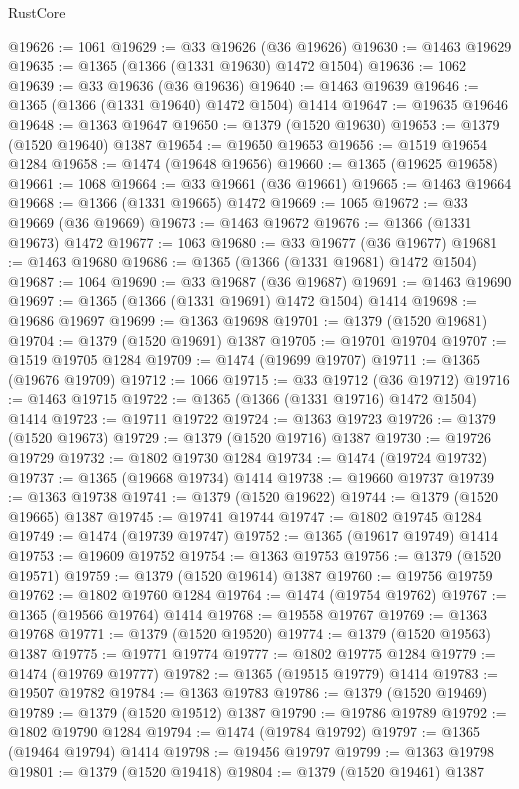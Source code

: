 \begin{lexlean}{RustCore}
\begin{coremodule}
@19626 := 1061
@19629 := @33 @19626 (@36 @19626)
@19630 := @1463 @19629
@19635 := @1365 (@1366 (@1331 @19630) @1472 @1504)
@19636 := 1062
@19639 := @33 @19636 (@36 @19636)
@19640 := @1463 @19639
@19646 := @1365 (@1366 (@1331 @19640) @1472 @1504) @1414
@19647 := @19635 @19646
@19648 := @1363 @19647
@19650 := @1379 (@1520 @19630)
@19653 := @1379 (@1520 @19640) @1387
@19654 := @19650 @19653
@19656 := @1519 @19654 @1284
@19658 := @1474 (@19648 @19656)
@19660 := @1365 (@19625 @19658)
@19661 := 1068
@19664 := @33 @19661 (@36 @19661)
@19665 := @1463 @19664
@19668 := @1366 (@1331 @19665) @1472
@19669 := 1065
@19672 := @33 @19669 (@36 @19669)
@19673 := @1463 @19672
@19676 := @1366 (@1331 @19673) @1472
@19677 := 1063
@19680 := @33 @19677 (@36 @19677)
@19681 := @1463 @19680
@19686 := @1365 (@1366 (@1331 @19681) @1472 @1504)
@19687 := 1064
@19690 := @33 @19687 (@36 @19687)
@19691 := @1463 @19690
@19697 := @1365 (@1366 (@1331 @19691) @1472 @1504) @1414
@19698 := @19686 @19697
@19699 := @1363 @19698
@19701 := @1379 (@1520 @19681)
@19704 := @1379 (@1520 @19691) @1387
@19705 := @19701 @19704
@19707 := @1519 @19705 @1284
@19709 := @1474 (@19699 @19707)
@19711 := @1365 (@19676 @19709)
@19712 := 1066
@19715 := @33 @19712 (@36 @19712)
@19716 := @1463 @19715
@19722 := @1365 (@1366 (@1331 @19716) @1472 @1504) @1414
@19723 := @19711 @19722
@19724 := @1363 @19723
@19726 := @1379 (@1520 @19673)
@19729 := @1379 (@1520 @19716) @1387
@19730 := @19726 @19729
@19732 := @1802 @19730 @1284
@19734 := @1474 (@19724 @19732)
@19737 := @1365 (@19668 @19734) @1414
@19738 := @19660 @19737
@19739 := @1363 @19738
@19741 := @1379 (@1520 @19622)
@19744 := @1379 (@1520 @19665) @1387
@19745 := @19741 @19744
@19747 := @1802 @19745 @1284
@19749 := @1474 (@19739 @19747)
@19752 := @1365 (@19617 @19749) @1414
@19753 := @19609 @19752
@19754 := @1363 @19753
@19756 := @1379 (@1520 @19571)
@19759 := @1379 (@1520 @19614) @1387
@19760 := @19756 @19759
@19762 := @1802 @19760 @1284
@19764 := @1474 (@19754 @19762)
@19767 := @1365 (@19566 @19764) @1414
@19768 := @19558 @19767
@19769 := @1363 @19768
@19771 := @1379 (@1520 @19520)
@19774 := @1379 (@1520 @19563) @1387
@19775 := @19771 @19774
@19777 := @1802 @19775 @1284
@19779 := @1474 (@19769 @19777)
@19782 := @1365 (@19515 @19779) @1414
@19783 := @19507 @19782
@19784 := @1363 @19783
@19786 := @1379 (@1520 @19469)
@19789 := @1379 (@1520 @19512) @1387
@19790 := @19786 @19789
@19792 := @1802 @19790 @1284
@19794 := @1474 (@19784 @19792)
@19797 := @1365 (@19464 @19794) @1414
@19798 := @19456 @19797
@19799 := @1363 @19798
@19801 := @1379 (@1520 @19418)
@19804 := @1379 (@1520 @19461) @1387

\end{coremodule}
\end{lexlean}
